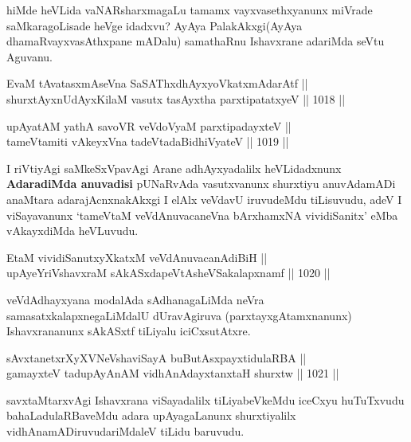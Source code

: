 \begin{artha}
hiMde heVLida vaNARsharxmagaLu tamamx vayxvasethxyanunx miVrade saMkaragoLisade heVge idadxvu? AyAya PalakAkxgi(AyAya dhamaRvayxvasAthxpane mADalu) samathaRnu Ishavxrane adariMda seVtu Aguvanu.
\end{artha}


\begin{shl}
EvaM tAvatasxmAseVna SaSAThxdhAyxyoVkatxmAdarAtf || \\
shurxtAyx\s nUdAyxKilaM vasutx tasAyxtha parxtipatatxyeV \hfill || 1018 ||  
\end{shl}
				
\begin{shl}
upAyatAM yathA savoVR veVdoV\s yaM parxtipadayxteV || \\
tameVtamiti vAkeyxVna tadeVtadaBidhiVyateV \hfill || 1019 ||  
\end{shl}

\begin{artha}
I riVtiyAgi saMkeSxVpavAgi Arane adhAyxyadalilx heVLidadxnunx \textbf{AdaradiMda anuvadisi}
pUNaRvAda vasutxvanunx shurxtiyu anuvAdamADi anaMtara adarajAcnxnakAkxgi I elAlx veVdavU iruvudeMdu tiLisuvudu, adeV I viSayavanunx `tameVtaM veVdAnuvacaneVna bArxhamxNA vividiSanitx' eMba vAkayxdiMda heVLuvudu.
\end{artha}


\begin{shl}
EtaM vividiSanutxyXkatxM veVdAnuvacanAdiBiH || \\
upAyeYriVshavxraM sAkASxdapeVtAsheVSakalapxnamf \hfill || 1020 ||  
\end{shl}

\begin{artha}
veVdAdhayxyana modalAda sAdhanagaLiMda neVra samasatxkalapxnegaLiMdalU dUravAgiruva (parxtayxgAtamxnanunx) Ishavxrananunx sAkASxtf tiLiyalu iciCxsutAtxre.
\end{artha}

\begin{shl}
sAvxtanetxrXyXVNeVshaviSayA buButAsx\s payxtidulaRBA || \\
gamayxteV tadupAyAnAM vidhAnAdayxtanxtaH shurxtw \hfill || 1021 ||  
\end{shl}

\begin{artha}
savxtaMtarxvAgi Ishavxrana viSayadalilx tiLiyabeVkeMdu iceCxyu huTuTxvudu bahaLadulaRBaveMdu adara upAyagaLanunx shurxtiyalilx vidhAnamADiruvudariMdaleV tiLidu baruvudu.
\end{artha}

